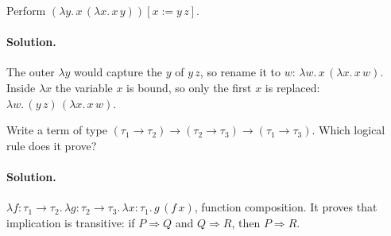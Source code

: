 \begin{exercise}
Perform $(\lambda y.\, x\, (\lambda x.\, x\, y))[x := y\, z]$.
\end{exercise}

\paragraph{Solution.} The outer $\lambda y$ would capture the $y$ of $y\, z$, so rename it
to $w$: $\lambda w.\, x\, (\lambda x.\, x\, w)$. Inside $\lambda x$ the variable $x$ is
bound, so only the first $x$ is replaced: $\lambda w.\, (y\, z)\, (\lambda x.\, x\, w)$.

\begin{exercise}
Write a term of type $(\tau_1 \to \tau_2) \to (\tau_2 \to \tau_3) \to (\tau_1 \to \tau_3)$.
Which logical rule does it prove?
\end{exercise}

\paragraph{Solution.} $\lambda f{:}\tau_1 \to \tau_2.\, \lambda g{:}\tau_2 \to \tau_3.\, \lambda x{:}\tau_1.\, g\,(f\, x)$,
function composition. It proves that implication is transitive: if
$P \Rightarrow Q$ and $Q \Rightarrow R$, then $P \Rightarrow R$.
